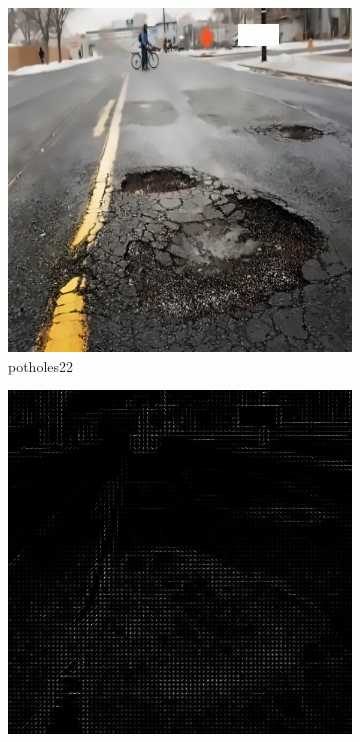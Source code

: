 \documentclass[a4paper, 10pt]{article}
\begin{document}
\begin{figure}[htbp]
		\begin{subfigure}{0.24\textwidth}
			\includegraphics[width=\linewidth]{picture/alldata_filled/potholes22}
			\caption{potholes22}
			\label{fig: potholes22 filled}	
		\end{subfigure}
		\begin{subfigure}{0.24\textwidth}
			\includegraphics[width=\linewidth]{picture/alldata_filled_hog/potholes22}

\end{subfigure}
\end{figure}
\end{document}
